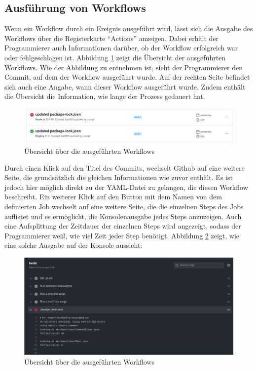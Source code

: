 	\subsection{Ausführung von Workflows}
	Wenn ein Workflow durch ein Ereignis ausgeführt wird, lässt sich die Ausgabe des Workflows über die Registerkarte \enquote{Actions} anzeigen. Dabei erhält der Programmierer auch Informationen darüber, ob der Workflow erfolgreich war oder fehlgeschlagen ist. Abbildung \ref{fig:workflow_overview} zeigt die Übersicht der ausgeführten Workflows. Wie der Abbildung zu entnehmen ist, sieht der Programmierer den Commit, auf dem der Workflow ausgeführt wurde. Auf der rechten Seite befindet sich auch eine Angabe, wann dieser Workflow ausgeführt wurde. Zudem enthält die Übersicht die Information, wie lange der Prozess gedauert hat. 
	\begin{figure}[h]
	    \centering
	    
	    \includegraphics[width=\columnwidth]{figures/workflow_overview.png}
	    \caption{Übersicht über die ausgeführten Workflows}
	    \label{fig:workflow_overview}
	\end{figure}
	
	Durch einen Klick auf den Titel des Commits, wechselt Github auf eine weitere Seite, die grundsätzlich die gleichen Informationen wie zuvor enthält. Es ist jedoch hier möglich direkt zu der YAML-Datei zu gelangen, die diesen Workflow beschreibt. Ein weiterer Klick auf den Button mit dem Namen von dem definierten Job wechselt auf eine weitere Seite, die die einzelnen Steps des Jobs auflistet und es ermöglicht, die Konsolenausgabe jedes Steps anzuzeigen. Auch eine Aufsplittung der Zeitdauer der einzelnen Steps wird angezeigt, sodass der Programmierer weiß, wie viel Zeit jeder Step benötigt. Abbildung \ref{fig:workflow_output} zeigt, wie eine solche Ausgabe auf der Konsole aussieht:
	\begin{figure}[h]
	    \centering
	    
	    \includegraphics[width=\columnwidth]{figures/workflow_output.png}
	    \caption{Übersicht über die ausgeführten Workflows}
	    \label{fig:workflow_output}
	\end{figure}
